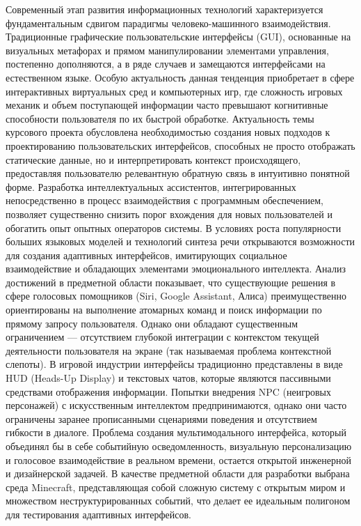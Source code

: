 Современный этап развития информационных технологий характеризуется фундаментальным сдвигом парадигмы человеко-машинного взаимодействия. Традиционные графические пользовательские интерфейсы (GUI), основанные на визуальных метафорах и прямом манипулировании элементами управления, постепенно дополняются, а в ряде случаев и замещаются интерфейсами на естественном языке. Особую актуальность данная тенденция приобретает в сфере интерактивных виртуальных сред и компьютерных игр, где сложность игровых механик и объем поступающей информации часто превышают когнитивные способности пользователя по их быстрой обработке.
Актуальность темы курсового проекта обусловлена необходимостью создания новых подходов к проектированию пользовательских интерфейсов, способных не просто отображать статические данные, но и интерпретировать контекст происходящего, предоставляя пользователю релевантную обратную связь в интуитивно понятной форме. Разработка интеллектуальных ассистентов, интегрированных непосредственно в процесс взаимодействия с программным обеспечением, позволяет существенно снизить порог вхождения для новых пользователей и обогатить опыт опытных операторов системы. В условиях роста популярности больших языковых моделей и технологий синтеза речи открываются возможности для создания адаптивных интерфейсов, имитирующих социальное взаимодействие и обладающих элементами эмоционального интеллекта.
Анализ достижений в предметной области показывает, что существующие решения в сфере голосовых помощников (Siri, Google Assistant, Алиса) преимущественно ориентированы на выполнение атомарных команд и поиск информации по прямому запросу пользователя. Однако они обладают существенным ограничением — отсутствием глубокой интеграции с контекстом текущей деятельности пользователя на экране (так называемая проблема контекстной слепоты). В игровой индустрии интерфейсы традиционно представлены в виде HUD (Heads-Up Display) и текстовых чатов, которые являются пассивными средствами отображения информации. Попытки внедрения NPC (неигровых персонажей) с искусственным интеллектом предпринимаются, однако они часто ограничены заранее прописанными сценариями поведения и отсутствием гибкости в диалоге. Проблема создания мультимодального интерфейса, который объединял бы в себе событийную осведомленность, визуальную персонализацию и голосовое взаимодействие в реальном времени, остается открытой инженерной и дизайнерской задачей.
В качестве предметной области для разработки выбрана среда Minecraft, представляющая собой сложную систему с открытым миром и множеством неструктурированных событий, что делает ее идеальным полигоном для тестирования адаптивных интерфейсов.
